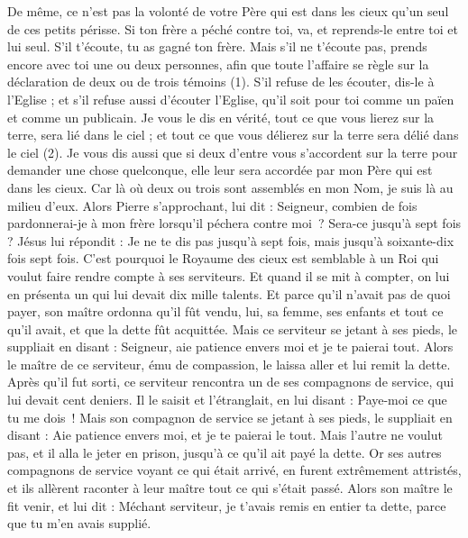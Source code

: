 \begin{multicols}{2}
{De même, ce n’est pas la volonté de votre Père qui est dans les cieux qu'un seul de ces petits périsse.
Si ton frère a péché contre toi, va, et reprends-le entre toi et lui seul. S’il t'écoute, tu as gagné ton frère.
Mais s'il ne t'écoute pas, prends encore avec toi une ou deux personnes, afin que toute l’affaire se règle sur la déclaration de deux ou de trois témoins (1).
S’il refuse de les écouter, dis-le à l'Eglise ; et s'il refuse aussi d’écouter l'Eglise, qu'il soit pour toi comme un païen et comme un publicain.
Je vous le dis en vérité, tout ce que vous lierez sur la terre, sera lié dans le ciel ; et tout ce que vous délierez sur la terre sera délié dans le ciel (2).
Je vous dis aussi que si deux d'entre vous s'accordent sur la terre pour demander une chose quelconque, elle leur sera accordée par mon Père qui est dans les cieux.
Car là où deux ou trois sont assemblés en mon Nom, je suis là au milieu d'eux.
Alors Pierre s'approchant, lui dit : Seigneur, combien de fois pardonnerai-je à mon frère lorsqu’il péchera contre moi ? Sera-ce jusqu'à sept fois ?
Jésus lui répondit : Je ne te dis pas jusqu'à sept fois, mais jusqu'à soixante-dix fois sept fois.
C'est pourquoi le Royaume des cieux est semblable à un Roi qui voulut faire rendre compte à ses serviteurs.
Et quand il se mit à compter, on lui en présenta un qui lui devait dix mille talents.
Et parce qu'il n'avait pas de quoi payer, son maître ordonna qu'il fût vendu, lui, sa femme, ses enfants et tout ce qu'il avait, et que la dette fût acquittée.
Mais ce serviteur se jetant à ses pieds, le suppliait en disant : Seigneur, aie patience envers moi et je te paierai tout.
Alors le maître de ce serviteur, ému de compassion, le laissa aller et lui remit la dette.
Après qu’il fut sorti, ce serviteur rencontra un de ses compagnons de service, qui lui devait cent deniers. Il le saisit et l'étranglait, en lui disant : Paye-moi ce que tu me dois !
Mais son compagnon de service se jetant à ses pieds, le suppliait en disant : Aie patience envers moi, et je te paierai le tout.
Mais l’autre ne voulut pas, et il alla le jeter en prison, jusqu'à ce qu'il ait payé la dette.
Or ses autres compagnons de service voyant ce qui était arrivé, en furent extrêmement attristés, et ils allèrent raconter à leur maître tout ce qui s'était passé.
Alors son maître le fit venir, et lui dit : Méchant serviteur, je t’avais remis en entier ta dette, parce que tu m'en avais supplié.
}
\end{multicols}
